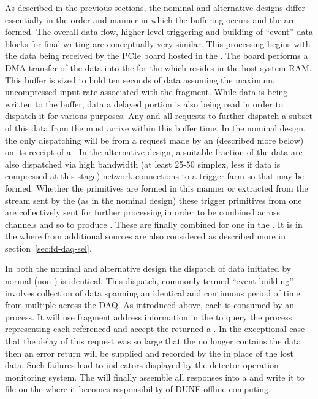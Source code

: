 As described in the previous sections, the nominal and alternative
designs differ essentially in the order and manner in which the
 buffering occurs and the  are
formed. 
The overall data flow, higher level triggering and building of
``event'' data blocks for final writing are conceptually very similar.
This processing begins with the data being received by the
 PCIe board hosted in the . 
The  board performs a DMA transfer of the data into the
 for the  which resides in the
 host system RAM.
This buffer is sized to hold ten seconds of data assuming the maximum,
uncompressed input rate associated with the fragment.
While data is being written to the buffer, data a delayed portion is
also being read in order to dispatch it for various purposes.
Any and all requests to further dispatch a subset of this data from
the  must arrive within this buffer time.
In the nominal design, the only dispatching will be from a request
made by an  (described more below) on its receipt of a
. 
In the alternative design, a suitable fraction of the data are also
dispatched via high bandwidth (at least 25-50 \si{\Gbps} simplex, less
if data is compressed at this stage) network connections to a trigger
farm so that  may be formed. 
Whether the primitives are formed in this manner or extracted from the
stream sent by the  (as in the nominal design) these
trigger primitives from one  are collectively sent for
further processing in order to be combined across channels and so to
produce . 
These are finally combined for one  in the
. 
It is in the  where  from additional
sources are also considered as described more in
section~\ref{sec:fd-daq-sel}.

In both the nominal and alternative design the dispatch of data
initiated by normal (non-)  is
identical. 
This dispatch, commonly termed ``event building'' involves collection
of data spanning an identical and continuous period of time from
multiple  across the DAQ.
As introduced above, each  is consumed by an
 process. 
It will use fragment address information in the  to
query the  process representing each referenced
 and accept the returned a .
In the exceptional case that the delay of this request was so large
that the  no longer contains the data then an error
return will be supplied and recorded by the  in place of the
lost data. 
Such failures lead to indicators displayed by the detector operation
monitoring system.
The  will finally assemble all responses into a
 and write it to file on the  where
it becomes responsibility of DUNE offline computing.

